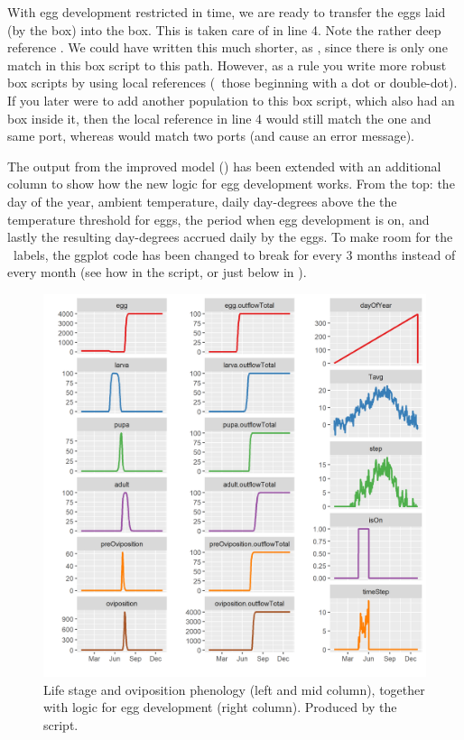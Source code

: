 With egg development restricted in time, we are ready to transfer the eggs laid (by the  box) into the  box. This is taken care of in line 4. Note the rather deep reference . We could have written this much shorter, as , since there is only one match in this box script to this path. However, as a rule you write more robust box scripts by using local references (\ie\ those beginning with a dot or double-dot). If you later were to add another population to this box script, which also had an  box inside it, then the local reference in line 4 would still match the one and same port, whereas  would match two ports (and cause an error message).

The output from the improved model () has been extended with an additional column to show how the new logic for egg development works. From the top: the day of the year, ambient temperature, daily day-degrees above the the temperature threshold for eggs, the period when egg development is on, and lastly the resulting day-degrees accrued daily by the eggs. To make room for the \xaxis\ labels, the ggplot code has been changed to break for every 3 months instead of every month (see how in the  script, or just below in ).

\begin{figure}
\centering
\includegraphics[width=\textwidth]{graphics/butterfly4}
\caption{Life stage and oviposition phenology (left and mid column), together with logic for egg development (right column). Produced by the  script.}
\label{fig:butterfly4}
\end{figure}

